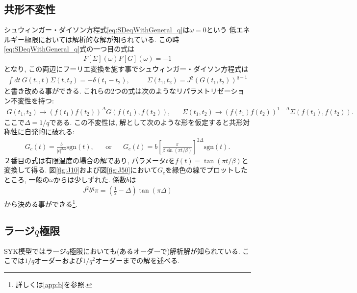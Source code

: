 \subsection{共形不変性}
シュウィンガー・ダイソン方程式\eqref{eq:SDeqWithGeneral_q}は$\omega = 0$という
低エネルギー極限においては解析的な解が知られている. 
この時\eqref{eq:SDeqWithGeneral_q}式の一つ目の式は
\begin{align}
	F[\Sigma](\omega)F[G](\omega) = -1
\end{align}
となり, この両辺にフーリエ変換を施す事でシュウィンガー・ダイソン方程式は
\begin{align}
	\int dt\ G(t_1, t)\Sigma(t, t_2) = -\delta(t_1 - t_2),
	\hspace{30pt}
	\Sigma(t_1, t_2) = J^2 (G(t_1, t_2))^{q-1}
	\label{eq:conformalSD}
\end{align}
と書き改める事ができる.
これらの2つの式は次のようなリパラメトリゼーション不変性を持つ:
\begin{align}
	G(t_1, t_2) \to (f(t_1)f(t_2))^{\Delta}G(f(t_1),f(t_2)),
	\hspace{20pt}
	\Sigma(t_1, t_2) \to (f(t_1)f(t_2))^{1 - \Delta}\Sigma(f(t_1),f(t_2)).
	\label{eq:reparametrization_of_G_and_Sigma}
\end{align}
ここで$\Delta = 1 / q$である. 
この不変性は, 解として次のような形を仮定すると共形対称性に自発的に破れる:
\begin{align}
	G_c(t) = \frac{b}{|t|^{2\Delta}}\mathrm{sgn}(t),
	\hspace{20pt}
	\mathrm{or}
	\hspace{20pt}
	G_c(t) = b\left[\frac{\pi}{\beta\sin(\pi t / \beta)}\right]^{2\Delta}\mathrm{sgn}(t).
	\label{eq:conformal_ansatz}
\end{align}
２番目の式は有限温度の場合の解であり, パラメータ$t$を$f(t) = \tan(\pi t / \beta)$と変換して得る. 
図\ref{fig:J10}および図\ref{fig:J50}において$G_c$を緑色の線でプロットしたところ, 一般の$\omega$からは少しずれた. 
係数$b$は
\begin{align}
	J^2 b^q \pi = \left(\frac{1}{2} - \Delta \right)\tan(\pi \Delta)
\end{align}
から決める事ができる\footnote{詳しくは\ref{app:b}を参照.}. 

\subsection{ラージ$q$極限}
SYK模型ではラージ$q$極限においても(あるオーダーで)解析解が知られている. 
ここでは$1/q$オーダーおよび$1/q^2$オーダーまでの解を述べる. 

